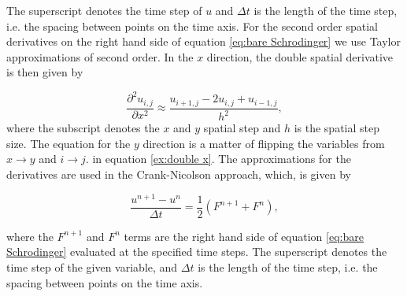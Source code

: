 \documentclass[english,notitlepage,reprint,nofootinbib]{revtex4-2}  %
\begin{document}
	\noindent
	The superscript denotes the time step of $u$ and $\Delta t$ is the length of the time
	step, i.e. the spacing between points on the time axis.	For the second order spatial derivatives
	on the right hand side of equation \ref{eq:bare Schrodinger}
	we use Taylor approximations of second order. In the $x$ direction,
	the double spatial derivative is then given by
	
	\begin{equation}\label{ex:double x}
		\frac{\partial^2 u_{i,j}}{\partial x^2} \approx \frac{u_{i+1,j}-2u_{i,j}+u_{i-1,j}}{h^2},
	\end{equation}
	where the subscript denotes the $x$ and $y$ spatial step and $h$ is the spatial step size.
	The equation for the $y$ direction is a matter of flipping the variables from
	$x \rightarrow y$ and $i \rightarrow j$.
	in equation \ref{ex:double x}. The approximations for the derivatives are used in
	the Crank-Nicolson approach, which, is given by
	
	\begin{equation}
		\frac{u^{n+1}-u^{n}}{\Delta t} = \frac{1}{2}    \left(     F^{n+1} + F^n     \right),
	\end{equation}

	\noindent
	where the $F^{n+1}$ and $F^n$ terms are the right hand side of equation \ref{eq:bare Schrodinger}
	evaluated at the specified time steps. The superscript denotes the time step of the given variable, and $\Delta t$ is the length of the time step,
	i.e. the spacing between points on the time axis.\\ \\
\end{document}
